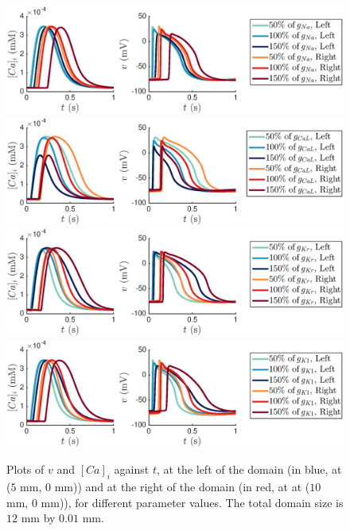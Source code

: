 \documentclass[12pt,a4paper]{article}
\begin{document}
\begin{figure}
   \includegraphics[trim=3cm 0cm 4cm 0cm, clip=true, width=1\linewidth]{strip_gna} 
   \includegraphics[trim=3cm 0cm 4cm 0cm, clip=true, width=1\linewidth]{strip_gcal} 
      \includegraphics[trim=3cm 0cm 4cm 0cm, clip=true, width=1\linewidth]{strip_gkr} 
         \includegraphics[trim=3cm 0cm 4cm 0cm, clip=true, width=1\linewidth]{strip_gk1} 
    \caption{Plots of $v$ and $[Ca]_i$ against $t$, at the left of the domain (in blue, at ($5$ mm, $0$ mm)) and at the right of the domain (in red, at at ($10$ mm, $0$ mm)), for different parameter values. The total domain size is $12$ mm by $0.01$ mm.}
    \label{fig:4}
\end{figure}
%
\end{document}
